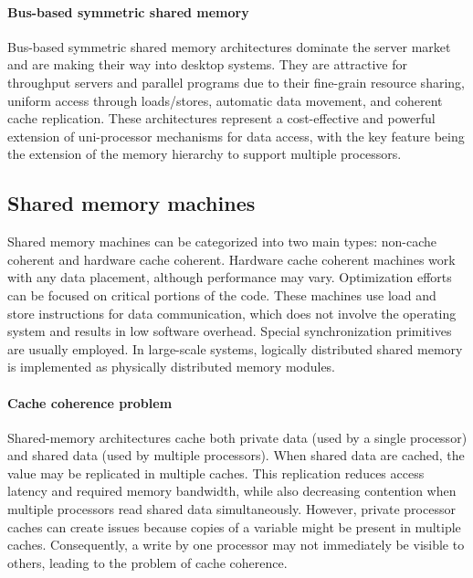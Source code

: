 \paragraph*{Bus-based symmetric shared memory}
Bus-based symmetric shared memory architectures dominate the server market and are making their way into desktop systems.
They are attractive for throughput servers and parallel programs due to their fine-grain resource sharing, uniform access through loads/stores, automatic data movement, and coherent cache replication. 
These architectures represent a cost-effective and powerful extension of uni-processor mechanisms for data access, with the key feature being the extension of the memory hierarchy to support multiple processors.

\subsection{Shared memory machines}
Shared memory machines can be categorized into two main types: non-cache coherent and hardware cache coherent. 
Hardware cache coherent machines work with any data placement, although performance may vary.
Optimization efforts can be focused on critical portions of the code. 
These machines use load and store instructions for data communication, which does not involve the operating system and results in low software overhead. 
Special synchronization primitives are usually employed. 
In large-scale systems, logically distributed shared memory is implemented as physically distributed memory modules.

\paragraph*{Cache coherence problem}
Shared-memory architectures cache both private data (used by a single processor) and shared data (used by multiple processors). 
When shared data are cached, the value may be replicated in multiple caches. 
This replication reduces access latency and required memory bandwidth, while also decreasing contention when multiple processors read shared data simultaneously. 
However, private processor caches can create issues because copies of a variable might be present in multiple caches. 
Consequently, a write by one processor may not immediately be visible to others, leading to the problem of cache coherence.

